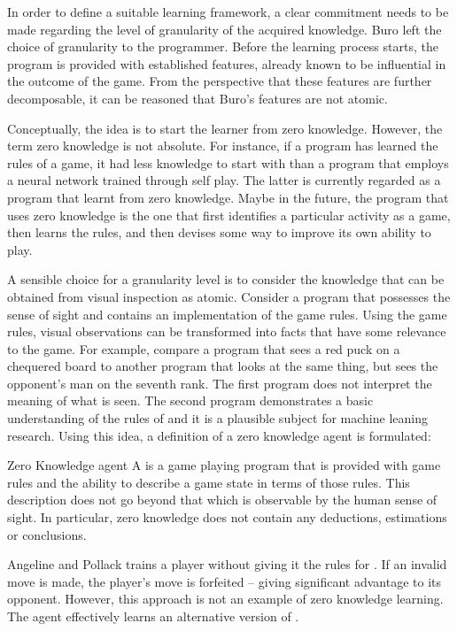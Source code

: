 In order to define a suitable learning framework, a clear commitment needs to be made regarding the level of granularity of the acquired knowledge. Buro left the choice of granularity to the programmer. Before the learning process starts, the program is provided with established features, already known to be influential in the outcome of the game.  From the perspective that these features are further decomposable, it can be reasoned that Buro's features are not atomic. 

Conceptually, the idea is to start the learner from zero knowledge.  However, the term zero knowledge is not absolute.  For instance, if a program has learned the rules of a game, it had less knowledge to start with than a program that employs a neural network trained through self play.  The latter  is currently regarded as a program that learnt from zero knowledge. Maybe in the future, the program that uses zero knowledge is the one that first identifies a particular activity as a game, then learns the rules, and then devises some way to improve its own ability to play.  

A sensible choice for a granularity level is to consider the knowledge that can be obtained from visual inspection as atomic.  Consider a program that possesses the sense of sight and contains an implementation of the game rules.  Using the game rules, visual observations can be transformed into facts that have some relevance to the game.  For example, compare a program that sees a red puck on a chequered board to another program that looks at the same thing, but sees the opponent's man on the seventh rank.  The first program does not interpret the meaning of what is seen. The second program demonstrates a basic understanding of the rules of  and it is a plausible subject for machine leaning research.  Using this idea, a definition of a zero knowledge agent is formulated:

\begin{definition} {Zero Knowledge agent}
\label{def:zero}\newline
A  is a game playing program that is provided with game rules and the ability to describe a game state in terms of those rules.  This description does not go beyond that which is observable by the human sense of sight.  In particular, zero knowledge does not contain any deductions, estimations or conclusions. 
\end{definition}

Angeline and Pollack \cite{angeline:evolve} trains a  player without giving it the rules for .  If an invalid move is made, the player's move is forfeited -- giving significant advantage to its opponent. However, this approach is not an example of zero knowledge learning. The agent effectively learns an alternative version of .

